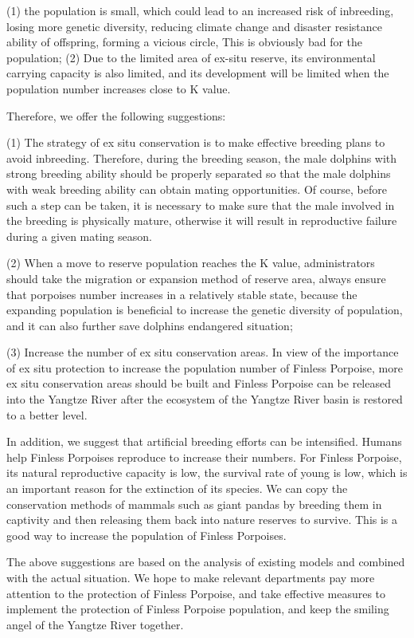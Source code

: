 \documentclass{mcmthesis}
\numberwithin{figure}{section}
\numberwithin{table}{section}
\numberwithin{equation}{section}
\begin{document}
\begin{memo}
  (1) the population is small, which could lead to an increased 
  risk of inbreeding, losing more genetic diversity, reducing 
  climate change and disaster resistance ability of offspring, 
  forming a vicious circle, This is obviously bad for the 
  population; (2) Due to the limited area of 
  ex-situ reserve, its environmental carrying capacity is also 
  limited, and its development will be limited when the population 
  number increases close to K value.
  \par Therefore, we offer the following suggestions:
  \par(1) The strategy of ex situ conservation is to make 
  effective breeding plans to avoid inbreeding. Therefore, 
  during the breeding season, the male dolphins with strong 
  breeding ability should be properly separated so that the 
  male dolphins with weak breeding ability can obtain mating 
  opportunities. Of course, before such a step can be taken, 
  it is necessary to make sure that the male involved in the 
  breeding is physically mature, otherwise it will result in 
  reproductive failure during a given mating season.
  \par(2) When a move to reserve population reaches the K value, 
  administrators should take the migration or expansion method 
  of reserve area, always ensure that porpoises number increases 
  in a relatively stable state, because the expanding 
  population is beneficial to increase the genetic diversity 
  of population, and it can also further save dolphins endangered 
  situation;
  \par(3) Increase the number of ex situ conservation areas. 
  In view of the importance of ex situ protection to increase 
  the population number of Finless Porpoise, more ex situ 
  conservation areas should be built and Finless Porpoise 
  can be released into the Yangtze River after the ecosystem 
  of the Yangtze River basin is restored to a better level.
  \par In addition, we suggest that artificial breeding efforts 
  can be intensified. Humans help Finless Porpoises reproduce 
  to increase their numbers. For Finless Porpoise, its natural 
  reproductive capacity is low, the survival rate of young is low, 
  which is an important reason for the extinction of its species. 
  We can copy the conservation methods of mammals such as giant 
  pandas by breeding them in captivity and then releasing them 
  back into nature reserves to survive. This is a good way to 
  increase the population of Finless Porpoises.
  \par The above suggestions are based on the analysis of 
  existing models and combined with the actual situation. 
  We hope to make relevant departments pay more attention to 
  the protection of Finless Porpoise, and take effective measures 
  to implement the protection of Finless Porpoise population, and 
  keep the smiling angel of the Yangtze River together.
  


  
\end{memo}
\end{document}

